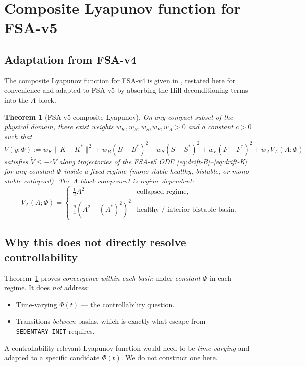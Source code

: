 \documentclass[11pt,a4paper]{article}
\newtheorem{theorem}{Theorem}
\theoremstyle{definition}
\begin{document}
\section{Composite Lyapunov function for FSA-v5} \label{app:lyapunov}

\subsection{Adaptation from FSA-v4}

The composite Lyapunov function for FSA-v4 is given in \cite[Theorem 11.1]{tech-guide-v5}, restated here for convenience and adapted to FSA-v5 by absorbing the Hill-deconditioning terms into the $A$-block.

\begin{theorem}[FSA-v5 composite Lyapunov]\label{thm:v5-lyap}
On any compact subset of the physical domain, there exist weights $w_K, w_B, w_S, w_F, w_A > 0$ and a constant $c > 0$ such that
\[
V(y; \Phi) := w_K \|K - K^*\|^2 + w_B (B - B^*)^2 + w_S (S - S^*)^2 + w_F (F - F^*)^2 + w_A V_A(A; \Phi)
\]
satisfies $\dot V \le -c V$ along trajectories of the FSA-v5 ODE \eqref{eq:drift-B}--\eqref{eq:drift-K} for any constant $\Phi$ inside a fixed regime (mono-stable healthy, bistable, or mono-stable collapsed). The $A$-block component is regime-dependent:
\[
V_A(A; \Phi) = \begin{cases}
\frac{1}{2}A^2 & \text{collapsed regime,} \\
\frac{\eta}{4}(A^2 - (A^*)^2)^2 & \text{healthy / interior bistable basin.}
\end{cases}
\]
\end{theorem}

\subsection{Why this does not directly resolve controllability}

Theorem~\ref{thm:v5-lyap} proves \emph{convergence within each basin} under \emph{constant} $\Phi$ in each regime. It does \emph{not} address:

\begin{itemize}
  \item Time-varying $\Phi(t)$ — the controllability question.
  \item Transitions \emph{between} basins, which is exactly what escape from \texttt{SEDENTARY\_INIT} requires.
\end{itemize}

A controllability-relevant Lyapunov function would need to be \emph{time-varying} and adapted to a specific candidate $\Phi(t)$. We do not construct one here.
\end{document}
